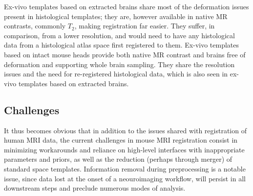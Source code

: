 Ex-vivo templates based on extracted brains share most of the deformation issues present in histological templates;
they are, however available in native MR contrasts, commonly $T_2$, making registration far easier.
They suffer, in comparison, from a lower resolution, and would need to have any histological data from a histological atlas space first registered to them.
Ex-vivo templates based on intact mouse heads provide both native MR contrast and brains free of deformation and supporting whole brain sampling.
They share the resolution issues and the need for re-registered histological data, which is also seen in ex-vivo templates based on extracted brains.

\subsection{Challenges}
It thus becomes obvious that in addition to the issues shared with registration of human MRI data, the current challenges in mouse MRI registration consist in minimizing workarounds and reliance on high-level interfaces with inappropriate parameters and priors, as well as the reduction (perhaps through merger) of standard space templates.
Information removal during preprocessing is a notable issue, since data lost at the onset of a neouroimaging workflow, will persist in all downstream steps and preclude numerous modes of analysis.


